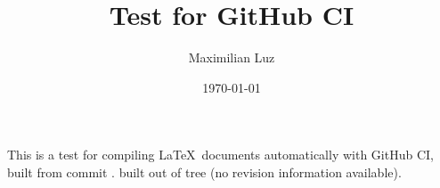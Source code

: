 \documentclass[draft]{article}
\author{Maximilian Luz}
\title{Test for GitHub CI}
\date{\today}
\begin{document}
\maketitle

This is a test for compiling \LaTeX\ documents automatically with GitHub CI,
\makeatletter\ifdefined\git@shortref
built from commit \git@shortref\git@dirty.
\else
built out of tree (no revision information available).
\fi\makeatother
\end{document}
